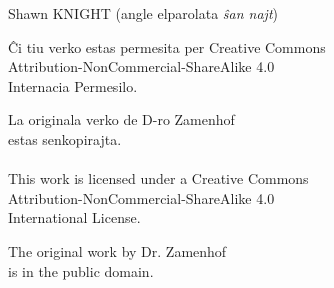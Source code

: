 \documentclass[12pt,twoside]{book}
\begin{document}
\vspace{1ex}

{\setlength{\parindent}{0em}
Shawn KNIGHT (angle elparolata \emph{ŝan najt})\\
\hodiau}

\clearpage
\thispagestyle{empty}
\vspace*{\fill}
\begin{center}
Ĉi tiu verko estas permesita per Creative Commons \\
Attribution-NonCommercial-ShareAlike 4.0 \\
Internacia Permesilo.

La originala verko de D-ro Zamenhof \\
estas senkopirajta.\\[1ex]

\ccbyncsa\\[1ex]

This work is licensed under a Creative Commons \\
Attribution-NonCommercial-ShareAlike 4.0 \\
International License.

The original work by Dr. Zamenhof \\
is in the public domain.
\vspace*{\fill}
\end{center}
\end{document}
